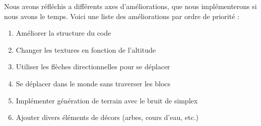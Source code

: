 Nous avons réfléchis a différents axes d'améliorations, que nous implémenterons si nous avons le temps. Voici une liste des améliorations par ordre de priorité :

\vspace{0.5cm}
\begin{enumerate}
	\item Améliorer la structure du code
	\item Changer les textures en fonction de l'altitude
	\item Utiliser les flèches directionnelles pour se déplacer
	\item Se déplacer dans le monde sans traverser les blocs
	\item Implémenter génération de terrain avec le bruit de simplex
	\item Ajouter divers éléments de décors (arbes, cours d'eau, etc.)
\end{enumerate}
\vspace{0.5cm}







